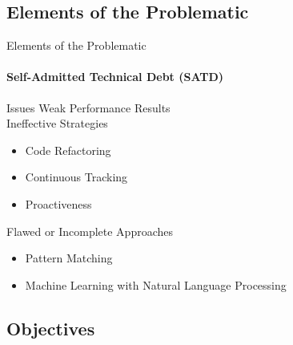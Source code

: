 \documentclass{beamer}
\begin{document}
\begin{darkframes}
						
						
			\subsection{Elements of the Problematic}
			
				\begin{frame}{Elements of the Problematic}	
					\framesubtitle{Self-Admitted Technical Debt (SATD)}	
					\begin{alertblock}{Issues}
						\alert{Weak Performance Results}\\
						\alert{Ineffective Strategies}
						\begin{itemize}
							\small
							\item Code Refactoring
							\item Continuous Tracking
							\item Proactiveness
						\end{itemize}
						\alert{Flawed or Incomplete Approaches}
						\begin{itemize}
							\small
							\item Pattern Matching
							\item Machine Learning with Natural Language Processing
						\end{itemize}
					\end{alertblock}
				\end{frame}
			

	
			\subsection{Objectives}
			

\end{darkframes}
\end{document}
